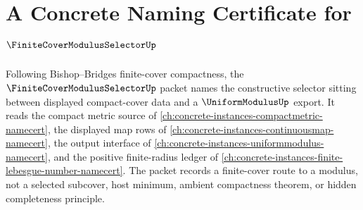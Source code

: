 \chapter{A Concrete Naming Certificate for $\FiniteCoverModulusSelectorUp$}
\label{ch:concrete-instances-finite-cover-modulus-selector-namecert}

Following Bishop--Bridges finite-cover compactness, the $\FiniteCoverModulusSelectorUp$ packet names the constructive selector sitting between displayed compact-cover data and a $\UniformModulusUp$ export. It reads the compact metric source of \autoref{ch:concrete-instances-compactmetric-namecert}, the displayed map rows of \autoref{ch:concrete-instances-continuousmap-namecert}, the output interface of \autoref{ch:concrete-instances-uniformmodulus-namecert}, and the positive finite-radius ledger of \autoref{ch:concrete-instances-finite-lebesgue-number-namecert}. The packet records a finite-cover route to a modulus, not a selected subcover, host minimum, ambient compactness theorem, or hidden completeness principle.

